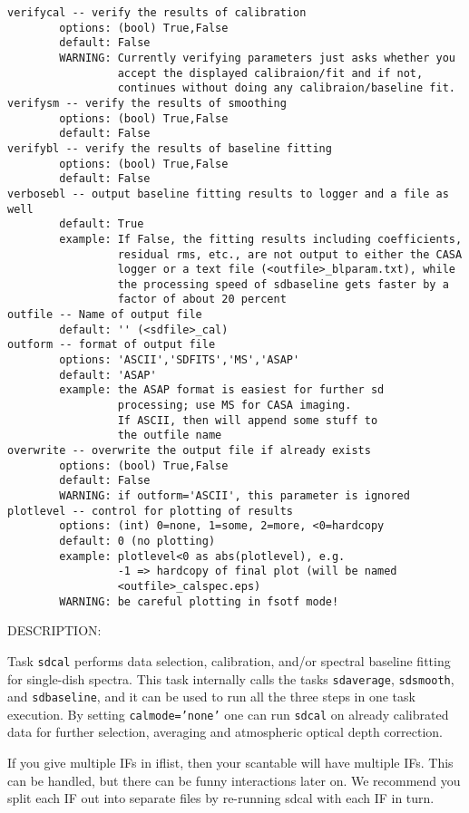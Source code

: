 \begin{verbatim}
verifycal -- verify the results of calibration
        options: (bool) True,False
        default: False
        WARNING: Currently verifying parameters just asks whether you 
                 accept the displayed calibraion/fit and if not, 
                 continues without doing any calibraion/baseline fit.
verifysm -- verify the results of smoothing
        options: (bool) True,False
        default: False
verifybl -- verify the results of baseline fitting
        options: (bool) True,False
        default: False
verbosebl -- output baseline fitting results to logger and a file as well
        default: True
        example: If False, the fitting results including coefficients, 
                 residual rms, etc., are not output to either the CASA 
                 logger or a text file (<outfile>_blparam.txt), while 
                 the processing speed of sdbaseline gets faster by a 
                 factor of about 20 percent
outfile -- Name of output file
        default: '' (<sdfile>_cal)
outform -- format of output file
        options: 'ASCII','SDFITS','MS','ASAP'
        default: 'ASAP'
        example: the ASAP format is easiest for further sd
                 processing; use MS for CASA imaging.
                 If ASCII, then will append some stuff to
                 the outfile name
overwrite -- overwrite the output file if already exists
        options: (bool) True,False
        default: False
        WARNING: if outform='ASCII', this parameter is ignored
plotlevel -- control for plotting of results
        options: (int) 0=none, 1=some, 2=more, <0=hardcopy
        default: 0 (no plotting)
        example: plotlevel<0 as abs(plotlevel), e.g.
                 -1 => hardcopy of final plot (will be named
                 <outfile>_calspec.eps)
        WARNING: be careful plotting in fsotf mode!

\end{verbatim}
    
DESCRIPTION:

    Task {\tt sdcal} performs data selection, calibration, and/or spectral
    baseline fitting for single-dish spectra. This task internally calls the
    tasks {\tt sdaverage}, {\tt sdsmooth}, and {\tt sdbaseline}, and it can be used to run all the
    three steps in one task execution.
    By setting {\tt calmode='none'}
    one can run {\tt sdcal} on already calibrated data for further selection, averaging and atmospheric optical depth correction.

    If you give multiple IFs in iflist, then your scantable will have
    multiple IFs. This can be handled, but there can be funny interactions
    later on.  We recommend you split each IF out into separate files
    by re-running sdcal with each IF in turn.

